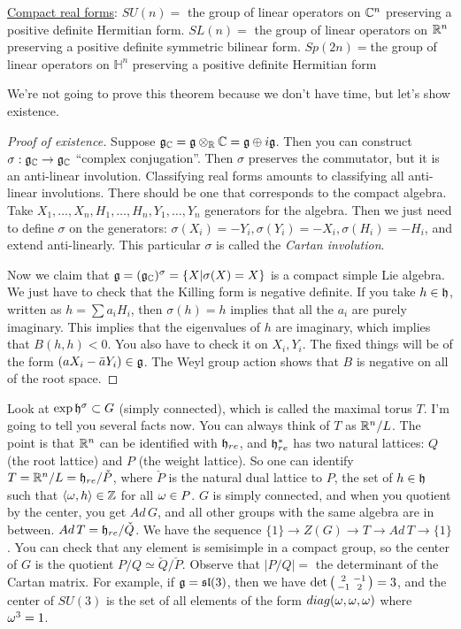  \underline{Compact real forms}: $SU(n)=$ the group of linear operators on $\mathbb{C}^n$
 preserving a positive definite Hermitian form. $SL(n)=$ the group of linear operators
 on $\mathbb{R}^n$ preserving a positive definite symmetric bilinear form. $Sp(2n)=$the group
 of linear operators on $\mathbb{H}^n$ preserving a positive definite Hermitian form

 We're not going to prove this theorem because we don't have time, but let's show
 existence.

 \begin{proof}[Proof of existence]
   Suppose $\mathfrak{g}_{\mathbb{C}} = \mathfrak{g}\otimes_{\mathbb{R}} \mathbb{C} = \mathfrak{g}\oplus i\mathfrak{g}$. Then you can construct
   $\sigma: \mathfrak{g}_{\mathbb{C}}\to \mathfrak{g}_{\mathbb{C}}$ ``complex conjugation''. Then $\sigma$ preserves the
   commutator, but it is an anti-linear involution. Classifying real forms amounts to
   classifying all anti-linear involutions. There should be one that corresponds to
   the compact algebra. Take $X_1,\dots, X_n, H_1,\dots, H_n,Y_1,\dots, Y_n$
   generators for the algebra. Then we just need to define $\sigma$ on the generators:
   $\sigma(X_i)=-Y_i, \sigma(Y_i)=-X_i, \sigma(H_i)=-H_i$, and extend anti-linearly.
   This particular $\sigma$ is called the \emph{Cartan
   involution}.

   Now we claim that $\mathfrak{g} = (\mathfrak{g}_{\mathbb{C}})^\sigma = \{X|\sigma(X)=X\}$ is a compact simple
   Lie algebra. We just have to check that the Killing form is negative definite. If
   you take $h\in \mathfrak{h}$, written as $h = \sum a_iH_i$, then $\sigma(h)=h$ implies that
   all the $a_i$ are purely imaginary. This implies that the eigenvalues of $h$ are
   imaginary, which implies that $B(h,h)<0$. You also have to check it on $X_i,Y_i$.
   The fixed things will be of the form $(aX_i-\bar aY_i)\in \mathfrak{g}$. The Weyl group
   action shows that $B$ is negative on all of the root space.
 \end{proof}

   Look at $\exp \mathfrak{h}^\sigma \subset G$ (simply connected), which is called the maximal
   torus $T$. I'm going to tell you several facts now. You can always think of $T$ as
   $\mathbb{R}^n/L$. The point is that $\mathbb{R}^n$ can be identified with $\mathfrak{h}_{re}$, and
   $\mathfrak{h}_{re}^*$ has two natural lattices: $Q$ (the root lattice) and $P$ (the weight
   lattice). So one can identify $T = \mathbb{R}^n/L = \mathfrak{h}_{re}/\check P$, where $\check P$ is
   the natural dual lattice to $P$, the set of $h\in \mathfrak{h}$ such that $\langle
   \omega,h\rangle \in \mathbb{Z}$ for all $\omega\in P$. $G$ is simply connected, and when you
   quotient by the center, you get $Ad\, G$, and all other groups with the same
   algebra are in between. $Ad\, T = \mathfrak{h}_{re}/\check Q$. We have the sequence
   $\{1\}\to Z(G)\to T \to Ad\, T \to \{1\}$. You can check that any element is
   semisimple in a compact group, so the center of $G$ is the quotient $P/Q\simeq
   \check Q/\check P$. Observe that $|P/Q| = $ the determinant of the Cartan matrix.
   For example, if $\mathfrak{g}=\mathfrak{sl}(3)$, then we have $\det\left( \begin{smallmatrix} 2 & -1 \\ -1 & 2 \end{smallmatrix} \right)=3$, and the
   center of $SU(3)$ is the set of all elements of the form $diag(\omega,\omega,\omega)$ where
   $\omega^3=1$.

